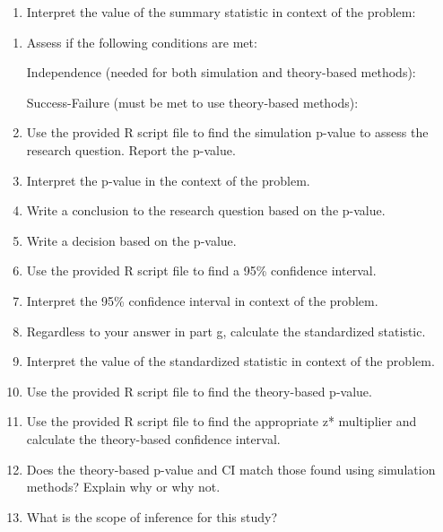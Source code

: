 \documentclass[
]{report}
\providecommand{\tightlist}{%
  \setlength{\itemsep}{0pt}\setlength{\parskip}{0pt}}
\begin{document}
\begin{enumerate}
\def\labelenumi{\alph{enumi}.}
\setcounter{enumi}{4}
\tightlist
\item
  Interpret the value of the summary statistic in context of the problem:
\end{enumerate}

\vspace{0.4in}

\begin{enumerate}
\def\labelenumi{\alph{enumi}.}
\setcounter{enumi}{6}
\item
  Assess if the following conditions are met:

  Independence (needed for both simulation and theory-based methods):
  \vspace{0.8in}

  Success-Failure (must be met to use theory-based methods):
  \vspace{0.8in}
\item
  Use the provided R script file to find the simulation p-value to assess the research question. Report the p-value.
  \vspace{0.3in}
\item
  Interpret the p-value in the context of the problem.
  \vspace{0.8in}
\item
  Write a conclusion to the research question based on the p-value.
  \vspace{0.8in}
\item
  Write a decision based on the p-value.
  \vspace{0.3in}
\item
  Use the provided R script file to find a 95\% confidence interval.
  \vspace{0.3in}
\item
  Interpret the 95\% confidence interval in context of the problem.
  \vspace{0.8in}
\item
  Regardless to your answer in part g, calculate the standardized statistic.
  \vspace{0.4in}
\item
  Interpret the value of the standardized statistic in context of the problem.
  \vspace{0.8in}
\item
  Use the provided R script file to find the theory-based p-value.
  \vspace{0.3in}
\item
  Use the provided R script file to find the appropriate z* multiplier and calculate the theory-based confidence interval.
  \vspace{0.5in}
\item
  Does the theory-based p-value and CI match those found using simulation methods? Explain why or why not.
  \vspace{0.8in}
\item
  What is the scope of inference for this study?
  \vspace{0.8in}
\end{enumerate}
\end{document}
